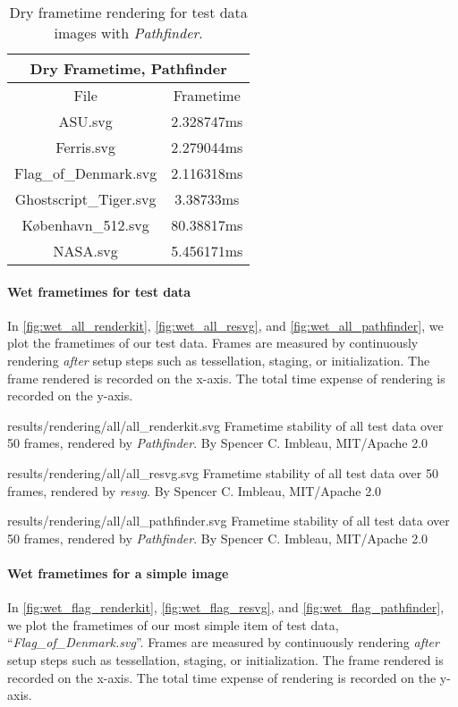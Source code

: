 \begin{table}[H]
\centering
\begin{tabular}{ |c|c| }
\hline
\multicolumn{2}{|c|}{Dry Frametime, Pathfinder}\\
\hline
File&Frametime\\
\hline
ASU.svg&2.328747ms\\
\hline
Ferris.svg&2.279044ms\\
\hline
Flag\_of\_Denmark.svg&2.116318ms\\
\hline
Ghostscript\_Tiger.svg&3.38733ms\\
\hline
København\_512.svg&80.38817ms\\
\hline
NASA.svg&5.456171ms\\
\hline
\end{tabular}
\caption{Dry frametime rendering for test data images with \textit{Pathfinder}.\label{tab:first_frame_pathfinder}}
\end{table}

\paragraph{Wet frametimes for test data}\label{sec:wet_frametimes}
In \cref{fig:wet_all_renderkit}, \cref{fig:wet_all_resvg}, and \cref{fig:wet_all_pathfinder}, we plot the frametimes of our test data. Frames are measured by continuously rendering \emph{after} setup steps such as tessellation, staging, or initialization. The frame rendered is recorded on the x-axis. The total time expense of rendering is recorded on the y-axis.\medskip

\widesvg
{results/rendering/all/all_renderkit.svg}
{Frametime stability of all test data over 50 frames, rendered by \textit{Pathfinder}.\label{fig:wet_all_renderkit}}
{By Spencer C. Imbleau, MIT/Apache 2.0}\medskip

\widesvg
{results/rendering/all/all_resvg.svg}
{Frametime stability of all test data over 50 frames, rendered by \textit{resvg}.\label{fig:wet_all_resvg}}
{By Spencer C. Imbleau, MIT/Apache 2.0}\medskip

\widesvg
{results/rendering/all/all_pathfinder.svg}
{Frametime stability of all test data over 50 frames, rendered by \textit{Pathfinder}.\label{fig:wet_all_pathfinder}}
{By Spencer C. Imbleau, MIT/Apache 2.0}

\paragraph{Wet frametimes for a simple image}
In \cref{fig:wet_flag_renderkit}, \cref{fig:wet_flag_resvg}, and \cref{fig:wet_flag_pathfinder}, we plot the frametimes of our most simple item of test data, ``\textit{Flag\_of\_Denmark.svg}''. Frames are measured by continuously rendering \emph{after} setup steps such as tessellation, staging, or initialization. The frame rendered is recorded on the x-axis. The total time expense of rendering is recorded on the y-axis.\medskip

